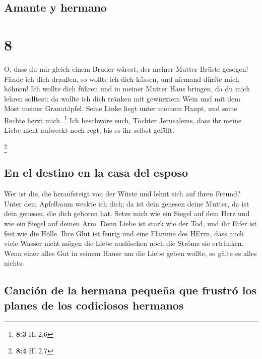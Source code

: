 \hypertarget{amante-y-hermano}{%
\subsection{Amante y hermano}\label{amante-y-hermano}}

\hypertarget{section-7}{%
\section{8}\label{section-7}}

 O, dass du mir gleich einem Bruder wärest, der meiner
Mutter Brüste gesogen! Fände ich dich draußen, so wollte ich dich
küssen, und niemand dürfte mich höhnen!  Ich wollte dich
führen und in meiner Mutter Haus bringen, da du mich lehren solltest; da
wollte ich dich tränken mit gewürztem Wein und mit dem Most meiner
Granatäpfel.  Seine Linke liegt unter meinem Haupt, und
seine Rechte herzt mich. \footnote{\textbf{8:3} Hl 2,6} 
Ich beschwöre euch, Töchter Jerusalems, dass ihr meine Liebe nicht
aufweckt noch regt, bis es ihr selbst gefällt.

\footnote{\textbf{8:4} Hl 2,7}

\hypertarget{en-el-destino-en-la-casa-del-esposo}{%
\subsection{En el destino en la casa del
esposo}\label{en-el-destino-en-la-casa-del-esposo}}

 Wer ist die, die heraufsteigt von der Wüste und lehnt
sich auf ihren Freund? Unter dem Apfelbaum weckte ich dich; da ist dein
genesen deine Mutter, da ist dein genesen, die dich geboren hat.
 Setze mich wie ein Siegel auf dein Herz und wie ein
Siegel auf deinen Arm. Denn Liebe ist stark wie der Tod, und ihr Eifer
ist fest wie die Hölle. Ihre Glut ist feurig und eine Flamme des HErrn,
 dass auch viele Wasser nicht mögen die Liebe auslöschen
noch die Ströme sie ertränken. Wenn einer alles Gut in seinem Hause um
die Liebe geben wollte, so gälte es alles nichts.

\hypertarget{canciuxf3n-de-la-hermana-pequeuxf1a-que-frustruxf3-los-planes-de-los-codiciosos-hermanos}{%
\subsection{Canción de la hermana pequeña que frustró los planes de los
codiciosos
hermanos}\label{canciuxf3n-de-la-hermana-pequeuxf1a-que-frustruxf3-los-planes-de-los-codiciosos-hermanos}}

